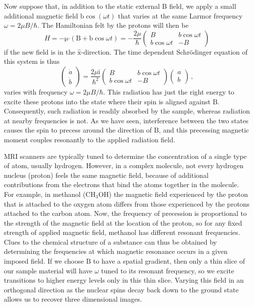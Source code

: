 \documentclass{article}
\theoremstyle{plain}\theoremheaderfont{\normalfont\itshape}\theorembodyfont{\rmfamily}\theoremseparator{.}\newtheorem*{rem}{Remark}\newtheorem*{ex}{Example}\newtheorem*{proof}{Proof}\newtheorem*{altp}{Alternative proof}
\theoremstyle{plain}\theoremheaderfont{\normalfont\bfseries}\theorembodyfont{\rmfamily}\theoremseparator{.}\newtheorem{thm}{Theorem}[section]\newtheorem{lem}[thm]{Lemma}\newtheorem{prop}[thm]{Proposition}\newtheorem*{cor}{Corollary}\newtheorem{defn}[thm]{Definition}\newtheorem{clm}[thm]{Claim}\newtheorem{clminproof}{Claim}
\theoremstyle{break}\theoremheaderfont{\normalfont\itshape}\theorembodyfont{\rmfamily}\theoremseparator{.\medskip}\newtheorem*{proofskip}{Proof}\newtheorem*{exs}{Examples}\newtheorem*{rems}{Remarks}
\theoremstyle{break}\theoremheaderfont{\normalfont\bfseries}\theorembodyfont{\rmfamily}\theoremseparator{.\medskip}\newtheorem{lemskip}[thm]{Lemma}\newtheorem{defnskip}[thm]{Definition}\newtheorem{propskip}[thm]{Proposition}\newtheorem{thmskip}[thm]{Theorem}
\numberwithin{equation}{section}
\newcommand{\ii}{\mathrm{i}}
\newcommand{\vb}[1]{\bm{\mathrm{#1}}}
\newcommand{\vu}[1]{\hat{\bm{\mathrm{#1}}}}
\newcommand{\vdot}{\bm{\cdot}}
\begin{document}
    Now suppose that, in addition to the static external \(\vb{B}\) field, we apply a small additional magnetic field \(\vb{b}\cos(\omega t)\) that varies at the same Larmor frequency \(\omega=2\mu B/\hbar\). The Hamiltonian felt by the protons will then be
    \begin{equation}
        H=-\vb{\mu}\vdot(\vb{B}+\vb{b}\cos\omega t)=-\frac{2\mu}{\hbar}\begin{pmatrix}
            B & b\cos\omega t \\
            b\cos\omega t & -B
        \end{pmatrix}
    \end{equation}
    if the new field is in the \(\vu{x}\)-direction. The time dependent Schr\"{o}dinger equation of this system is thus
    \begin{equation}
        \begin{pmatrix}
            \dot{a} \\ \dot{b}
        \end{pmatrix}=\frac{2\mu\ii}{\hbar^2}\begin{pmatrix}
            B & b\cos\omega t \\
            b\cos\omega t & -B
        \end{pmatrix}\begin{pmatrix}
            a \\ b
        \end{pmatrix}\,,
    \end{equation}
    varies with frequency \(\omega=2\mu B/\hbar\). This radiation has just the right energy to excite these protons into the state where their spin is aligned against \(\vb{B}\). Consequently, such radiation is readily absorbed by the sample, whereas radiation at nearby frequencies is not. As we have seen, interference between the two states causes the spin to precess around the direction of \(\vb{B}\), and this precessing magnetic moment couples resonantly to the applied radiation field.

    MRI scanners are typically tuned to determine the concentration of a single type of atom, usually hydrogen. However, in a complex molecule, not every hydrogen nucleus (proton) feels the same magnetic field, because of additional contributions from the electrons that bind the atoms together in the molecule. For example, in methanol (\(\mathrm{CH_3OH}\)) the magnetic field experienced by the proton that is attached to the oxygen atom differs from those experienced by the protons attached to the carbon atom. Now, the frequency of precession is proportional to the strength of the magnetic field at the location of the proton, so for any fixed strength of applied magnetic field, methanol has different resonant frequencies. Clues to the chemical structure of a substance can thus be obtained by determining the frequencies at which magnetic resonance occurs in a given imposed field. If we choose \(\vb{B}\) to have a spatial gradient, then only a thin slice of our sample material will have \(\omega\) tuned to its resonant frequency, so we excite transitions to higher energy levels only in this thin slice. Varying this field in an orthogonal direction as the nuclear spins decay back down to the ground state allows us to recover three dimensional images.
\end{document}
